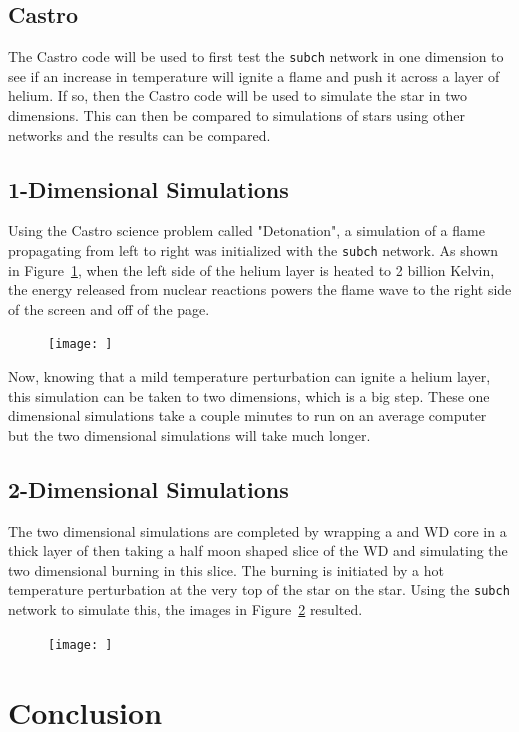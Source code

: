 \documentclass[11pt, oneside]{article}   	%
\begin{document}
  \subsection{Castro}
  
    The Castro code will be used to first test the {\tt subch} network in one dimension to see if an increase in temperature will ignite a flame and push it across a layer of helium. If so, then the Castro code will be used to simulate the star in two dimensions. This can then be compared to simulations of stars using other networks and the results can be compared. 
    
    \subsection{1-Dimensional Simulations}
    
      Using the Castro science problem called "Detonation", a simulation of a flame propagating from left to right was initialized with the {\tt subch} network. As shown in Figure~\ref{fig:detonation}, when the left side of the helium layer is heated to 2 billion Kelvin, the energy released from nuclear reactions powers the flame wave to the right side of the screen and off of the page. 
      
      \begin{figure}
        \centering
        \texttt{[image: ]}
        \caption{}
        \label{fig:detonation}
      \end{figure}
      
      Now, knowing that a mild temperature perturbation can ignite a helium layer, this simulation can be taken to two dimensions, which is a big step. These one dimensional simulations take a couple minutes to run on an average computer but the two dimensional simulations will take much longer. 
    
    \subsection{2-Dimensional Simulations}
  
      The two dimensional simulations are completed by wrapping a  and  WD core in a thick layer of  then taking a half moon shaped slice of the WD and simulating the two dimensional burning in this slice. The burning is initiated by a hot temperature perturbation at the very top of the star on the star. Using the {\tt subch} network to simulate this, the images in Figure~\ref{fig:subchsims} resulted. 
      
      
      \begin{figure}
        \centering
        \texttt{[image: ]}
        \caption{}
        \label{fig:subchsims}
      \end{figure}
      
  
\section{Conclusion}

  
\end{document}
